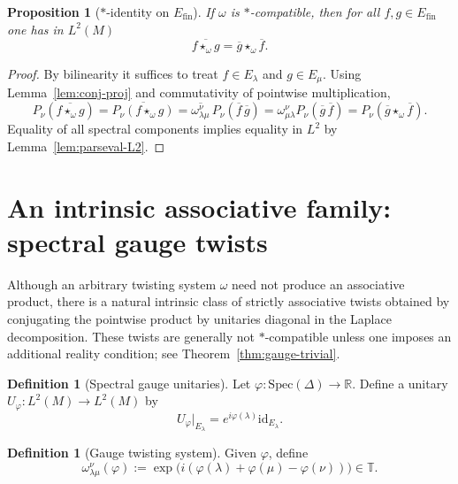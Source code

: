 \documentclass[11pt]{amsart}
\theoremstyle{plain}
\newtheorem{proposition}[theorem]{Proposition}
\theoremstyle{definition}
\newtheorem{definition}[theorem]{Definition}
\theoremstyle{remark}
\newcommand{\Spec}{\mathrm{Spec}}
\newcommand{\id}{\mathrm{id}}
\newcommand{\bbR}{\mathbb{R}}
\newcommand{\bbT}{\mathbb{T}}
\begin{document}
\begin{proposition}[$*$-identity on $E_{\mathrm{fin}}$]\label{prop:star-id}
If $\omega$ is $*$-compatible, then for all $f,g\in E_{\mathrm{fin}}$ one has in $L^2(M)$
\[ \overline{f\star_\omega g}=\overline g\star_\omega\overline f. \]
\end{proposition}

\begin{proof}
By bilinearity it suffices to treat $f\in E_\lambda$ and $g\in E_\mu$.
Using Lemma~\ref{lem:conj-proj} and commutativity of pointwise multiplication,
\[ P_\nu(\overline{f\star_\omega g})=\overline{P_\nu(f\star_\omega g)}=
\overline{\omega^{\nu}_{\lambda\mu}}\,P_\nu(\overline f\,\overline g)=\omega^{\nu}_{\mu\lambda}P_\nu(\overline g\,\overline f)=P_\nu(\overline g\star_\omega\overline f). \]
Equality of all spectral components implies equality in $L^2$ by Lemma~\ref{lem:parseval-L2}.
\end{proof}

\section{An intrinsic associative family: spectral gauge twists}\label{sec:gauge}

Although an arbitrary twisting system $\omega$ need not produce an associative product,
there is a natural intrinsic class of strictly associative twists obtained by conjugating the pointwise product by
unitaries diagonal in the Laplace decomposition. These twists are generally not $*$-compatible unless one imposes an
additional reality condition; see Theorem~\ref{thm:gauge-trivial}.

\begin{definition}[Spectral gauge unitaries]
Let $\varphi:\Spec(\Delta)\to\bbR$.
Define a unitary $U_\varphi:L^2(M)\to L^2(M)$ by
\[ U_\varphi\big|_{E_\lambda}=e^{i\varphi(\lambda)}\id_{E_\lambda}. \]
\end{definition}

\begin{definition}[Gauge twisting system]
Given $\varphi$, define
\begin{equation}\label{eq:gauge-u}
 \omega^{\nu}_{\lambda\mu}(\varphi):=\exp\big(i(\varphi(\lambda)+\varphi(\mu)-\varphi(\nu))\big)\in\bbT.
\end{equation}
\end{definition}
\end{document}
